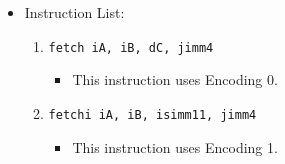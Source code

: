 \documentclass{article}
\begin{document}
\begin{itemize}
		\item Instruction List:
			\begin{enumerate}
			\item \texttt{fetch iA, iB, dC, jimm4}
				\begin{itemize}
				\item This instruction uses Encoding 0.
				\end{itemize}
			\item \texttt{fetchi iA, iB, isimm11, jimm4}
				\begin{itemize}
				\item This instruction uses Encoding 1.
				\end{itemize}
			\end{enumerate}
		\end{itemize}
		\newpage
\end{document}
